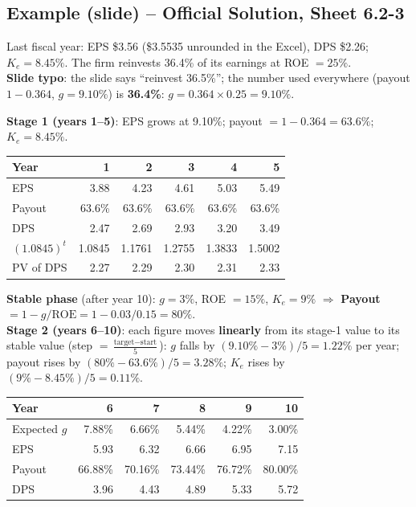 \subsection{Example (slide) -- Official Solution, Sheet 6.2-3}
\begin{exbox}
Last fiscal year: EPS \$3.56 (\$3.5535 unrounded in the Excel), DPS \$2.26; $K_e=8.45\%$. The firm reinvests 36.4\% of its earnings at ROE $=25\%$.\\
\textcolor{keyred}{\textbf{Slide typo}}: the slide says ``reinvest 36.5\%''; the number used everywhere (payout $1-0.364$, $g=9.10\%$) is \textbf{36.4\%}: $g=0.364\times0.25=\mathbf{9.10\%}$.

\textbf{Stage 1 (years 1--5)}: EPS grows at 9.10\%; payout $=1-0.364=63.6\%$; $K_e=8.45\%$.
\begin{center}
\small
\begin{tabular}{@{}lrrrrr@{}}
\toprule
Year & 1 & 2 & 3 & 4 & 5\\
\midrule
EPS & 3.88 & 4.23 & 4.61 & 5.03 & 5.49\\
Payout & 63.6\% & 63.6\% & 63.6\% & 63.6\% & 63.6\%\\
DPS & 2.47 & 2.69 & 2.93 & 3.20 & 3.49\\
$(1.0845)^t$ & 1.0845 & 1.1761 & 1.2755 & 1.3833 & 1.5002\\
PV of DPS & 2.27 & 2.29 & 2.30 & 2.31 & 2.33\\
\bottomrule
\end{tabular}
\end{center}
\textbf{Stable phase} (after year 10): $g=3\%$, ROE $=15\%$, $K_e=9\%$ $\Rightarrow$ \textbf{Payout $=1-g/\text{ROE}=1-0.03/0.15=80\%$}.\\
\textbf{Stage 2 (years 6--10)}: each figure moves \textbf{linearly} from its stage-1 value to its stable value (step $=\frac{\text{target}-\text{start}}{5}$): $g$ falls by $(9.10\%-3\%)/5=1.22\%$ per year; payout rises by $(80\%-63.6\%)/5=3.28\%$; $K_e$ rises by $(9\%-8.45\%)/5=0.11\%$.
\begin{center}
\small
\begin{tabular}{@{}lrrrrr@{}}
\toprule
Year & 6 & 7 & 8 & 9 & 10\\
\midrule
Expected $g$ & 7.88\% & 6.66\% & 5.44\% & 4.22\% & 3.00\%\\
EPS & 5.93 & 6.32 & 6.66 & 6.95 & 7.15\\
Payout & 66.88\% & 70.16\% & 73.44\% & 76.72\% & 80.00\%\\
DPS & 3.96 & 4.43 & 4.89 & 5.33 & 5.72\\

\end{tabular}
\end{center}
\end{exbox}
